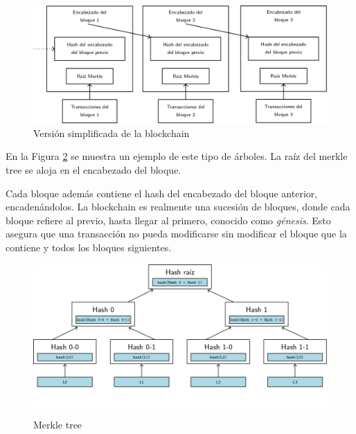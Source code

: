 \begin{figure}[h]
  \centering
  \includegraphics[scale=0.4]{figures/blockchain.png}
  \caption{Versión simplificada de la blockchain}
  \label{fig:blockchain}
\end{figure}


En la Figura \ref{fig:merkle-tree} se muestra un ejemplo de este tipo de árboles.
La raíz del merkle tree se aloja en el encabezado del bloque.

%
Cada bloque además contiene el hash del encabezado del bloque anterior, encadenándolos.
La blockchain es realmente una sucesión de bloques, donde cada bloque refiere al previo,
hasta llegar al primero, conocido como \textit{génesis}.
Esto asegura que una transacción no pueda modificarse sin modificar el bloque
que la contiene y todos los bloques siguientes.~\cite{bitcoin}

\begin{figure}[h]
  \centering
  \includegraphics[scale=0.4]{figures/merkle-tree.png}
  \caption{Merkle tree}
  \label{fig:merkle-tree}
\end{figure}


